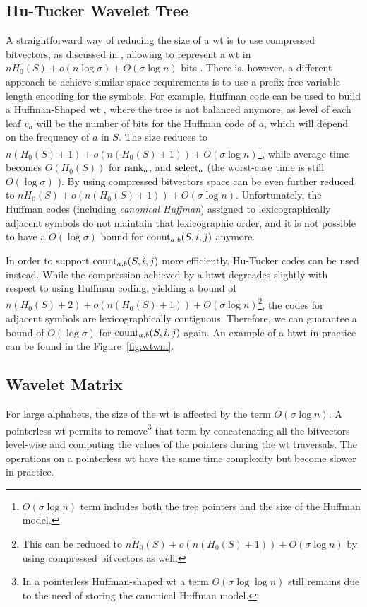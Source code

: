 \documentclass[a4paper,10pt,twoside]{book}
\begin{document}
    \subsection{Hu-Tucker Wavelet Tree}
    A straightforward way of reducing the size of a \gls{wt} is to use compressed bitvectors, as discussed in \cite{CNspire08.1}, allowing to represent a \gls{wt} in $nH_0(S) + o(n\log\sigma) + O(\sigma\log n)$ bits \cite{WT03}. There is, however, a different approach to achieve similar space requirements is to use a prefix-free variable-length encoding for the symbols.
    For example, Huffman code \cite{huffman1952method} can be used to build a
    Huffman-Shaped \gls{wt} \cite{ferragina2009compressed}, where the tree is not balanced
    anymore, as level of each leaf $v_a$ will be the number of bits for the Huffman code of $a$, which will depend on the frequency of $a$ in $S$. The size reduces to $n(H_0(S)+1)+ o(n(H_0(S)+1)) +  O(\sigma \log n)$\footnote{$O(\sigma \log n)$ term 
    includes both the tree pointers and the size of the Huffman model.}, while average time becomes
    $O(H_0(S))$ for $\operatorname{rank}_a$, and $\operatorname{select}_a$  (the worst-case time is still $O(\log\sigma)$ 
    \cite{Barbay:2013:CPA:2562345.2562626}). By using compressed
    bitvectors \cite{CNspire08.1} space can be even further reduced to $nH_0(S) + o(n(H_0(S)+1)) +  O(\sigma \log n)$.
    Unfortunately, the Huffman codes (including \textit{canonical Huffman}) assigned to
    lexicographically adjacent symbols do not maintain that lexicographic order, and it is not possible to have a $O(\log\sigma)$ bound for $\operatorname{count}_{a,b}(S,i,j)$ anymore.
	
	In order to support $\operatorname{count}_{a,b}(S,i,j)$ more efficiently, Hu-Tucker codes \cite{hu1971optimal} can be used instead. While the compression achieved by a \gls{htwt} \cite{barbay2009compressed} degreades slightly with respect to using Huffman coding, yielding a bound of $n(H_0(S)+2) + o(n(H_0(S)+1)) +  O(\sigma \log n)$\footnote{This can be reduced to  $nH_0(S) + o(n(H_0(S)+1)) +  O(\sigma \log n)$ by using compressed bitvectors as well.}, the codes for adjacent symbols are lexicographically contiguous. Therefore, we can guarantee a bound of $O(\log\sigma)$ for $\operatorname{count}_{a,b}(S,i,j)$ again. An example of a \gls{htwt} in practice can be found in the Figure~\ref{fig:wtwm}.
	
	\subsection{Wavelet Matrix}
	\label{sec:wm}
	For large alphabets, the size of the \gls{wt} is affected by the term $ O(\sigma \log n)$. A {pointerless}
    \gls{wt} \cite{CNspire08.1} permits to remove\footnote{In a pointerless Huffman-shaped \gls{wt}  a
    term $O(\sigma \log\log n)$ still remains due to the need of storing the canonical Huffman model.} 
    that term by concatenating all the bitvectors level-wise 
    and computing the values of the pointers during the \gls{wt} traversals. 
    The operations on a pointerless \gls{wt} have the same time complexity but become slower in practice. 
    
\end{document}
